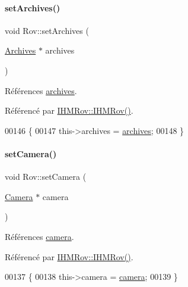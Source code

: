 \paragraph{\texorpdfstring{set\+Archives()}{setArchives()}}
{\footnotesize\ttfamily void Rov\+::set\+Archives (\begin{DoxyParamCaption}\item[{\hyperlink{class_archives}{Archives} $\ast$}]{archives }\end{DoxyParamCaption})}



Références \hyperlink{class_rov_ad41ed46f169f28da226a979f70c4d8a4}{archives}.



Référencé par \hyperlink{class_i_h_m_rov_a5dac1fb4612866cc61f699a415e0ef6b}{I\+H\+M\+Rov\+::\+I\+H\+M\+Rov()}.


\begin{DoxyCode}
00146 \{
00147     this->archives = \hyperlink{class_rov_ad41ed46f169f28da226a979f70c4d8a4}{archives};
00148 \}
\end{DoxyCode}
\mbox{\label{class_rov_a0eba2119b89406948976ae92781c4629}} 
\paragraph{\texorpdfstring{set\+Camera()}{setCamera()}}
{\footnotesize\ttfamily void Rov\+::set\+Camera (\begin{DoxyParamCaption}\item[{\hyperlink{class_camera}{Camera} $\ast$}]{camera }\end{DoxyParamCaption})}



Références \hyperlink{class_rov_ad0461ecece812497ee9b4a962f168c18}{camera}.



Référencé par \hyperlink{class_i_h_m_rov_a5dac1fb4612866cc61f699a415e0ef6b}{I\+H\+M\+Rov\+::\+I\+H\+M\+Rov()}.


\begin{DoxyCode}
00137 \{
00138     this->camera = \hyperlink{class_rov_ad0461ecece812497ee9b4a962f168c18}{camera};
00139 \}
\end{DoxyCode}
\mbox{\label{class_rov_a9bbaec4a59dae307440bfeefbc56190b}} 
